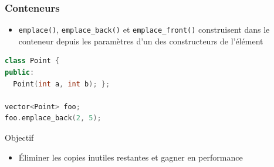 \documentclass[C++.tex]{subfiles}
\begin{document}
\begin{frame}[fragile]
	\frametitle{Conteneurs}
	\begin{itemize}
		\item \lstinline|emplace()|, \lstinline|emplace_back()| et \lstinline|emplace_front()| construisent dans le conteneur depuis les paramètres d'un des constructeurs de l'élément
	\end{itemize}

	\begin{lstlisting}[language=C++]
class Point {
public:
  Point(int a, int b); };

vector<Point> foo;
foo.emplace_back(2, 5);\end{lstlisting}

	\begin{block}{Objectif}
		\begin{itemize}
			\item Éliminer les copies inutiles restantes et gagner en performance
		\end{itemize}

	\end{block}
\end{frame}
\end{document}
